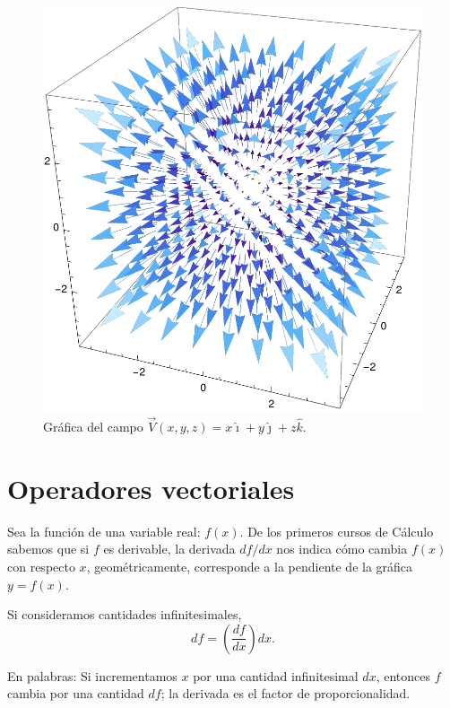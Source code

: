 \begin{ejemplo}
\begin{itemize}
        \begin{figure}[H]
            \centering
            \includegraphics[scale = 0.44]{Figuras/CampoVectorial2.pdf}
            \caption{Gráfica del campo  $\vec{V}(x,y,z) = x \hat{\imath} + y \hat{\jmath} + z \hat{k}$.}
            \label{fig:Campo_Vectorial2}
        \end{figure}
    \end{itemize}
\end{ejemplo}

\section{Operadores vectoriales} \label{Operadores}

Sea la función de una variable real: $f(x)$. De los primeros cursos de Cálculo sabemos que si $f$ es derivable, la derivada $df/dx$ nos indica cómo cambia $f(x)$ con respecto $x$, geométricamente, corresponde a la pendiente de la gráfica $y = f(x)$. 

Si consideramos cantidades infinitesimales,
$$df = \left(\frac{df}{dx} \right) dx.$$

En palabras: Si incrementamos $x$ por una cantidad infinitesimal $dx$, entonces $f$ cambia por una cantidad $df$; la derivada es el factor de proporcionalidad.

